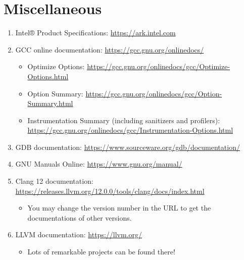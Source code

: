 \documentclass{article}
\begin{document}
\section{Miscellaneous}
\begin{enumerate}
    \item Intel® Product Specifications:
    \href{https://ark.intel.com}{https://ark.intel.com}
    \item GCC online documentation:
    \href{https://gcc.gnu.org/onlinedocs/}{https://gcc.gnu.org/onlinedocs/}
    \begin{itemize}
        \item Optimize Options:
        \href{https://gcc.gnu.org/onlinedocs/gcc/Optimize-Options.html}{https://gcc.gnu.org/onlinedocs/gcc/Optimize-Options.html}
        \item Option Summary:
        \href{https://gcc.gnu.org/onlinedocs/gcc/Option-Summary.html}{https://gcc.gnu.org/onlinedocs/gcc/Option-Summary.html}
        \item Instrumentation Summary (including sanitizers and profilers):\\
        \href{https://gcc.gnu.org/onlinedocs/gcc/Instrumentation-Options.html}{https://gcc.gnu.org/onlinedocs/gcc/Instrumentation-Options.html}
    \end{itemize}
    \item GDB documentation:
    \href{https://www.sourceware.org/gdb/documentation/}{https://www.sourceware.org/gdb/documentation/}
    \item GNU Manuals Online:
    \href{https://www.gnu.org/manual/}{https://www.gnu.org/manual/}
    \item Clang 12 documentation:
    \href{https://releases.llvm.org/12.0.0/tools/clang/docs/index.html}{https://releases.llvm.org/12.0.0/tools/clang/docs/index.html}
    \begin{itemize}
        \item You may change the version number in the URL to get the documentations of other versions.
    \end{itemize}
    \item LLVM documentation:
    \href{https://llvm.org/}{https://llvm.org/}
    \begin{itemize}
        \item Lots of remarkable projects can be found there!
    \end{itemize}
\end{enumerate}



\end{document}
